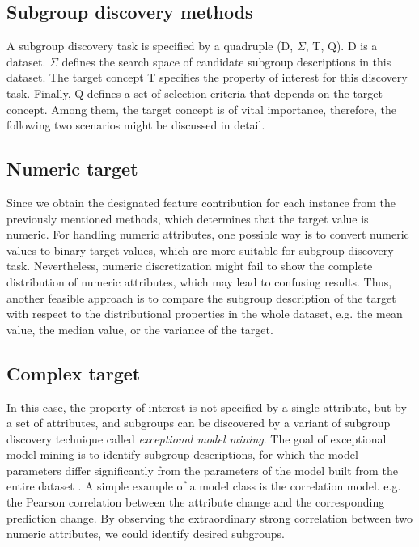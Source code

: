 \documentclass[runningheads]{llncs}
\begin{document}
	\subsection{Subgroup discovery methods}
	
	A subgroup discovery task is specified by a quadruple (D, $\Sigma$, T, Q). D is a dataset. $\Sigma$ defines the search space of candidate subgroup descriptions in this dataset. The target concept T specifies the property of interest for this discovery task. Finally, Q defines a set of selection criteria that depends on the target concept. Among them, the target concept is of vital importance, therefore, the following two scenarios might be discussed in detail.
	
	\subsection{Numeric target }
	
	Since we obtain the designated feature contribution for each instance from the previously mentioned methods, which determines that the target value is numeric. For handling numeric attributes, one possible way is to convert numeric values to binary target values, which are more suitable for subgroup discovery task. Nevertheless, numeric discretization might fail to show the complete distribution of numeric attributes, which may lead to confusing results. Thus, another feasible approach is to compare the subgroup description of the target with respect to the distributional properties in the whole dataset, e.g. the mean value, the median value, or the variance of the target.
	
	\subsection{Complex target }
	
	In this case, the property of interest is not specified by a single attribute, but by a set of attributes, and subgroups can be discovered by a variant of subgroup discovery technique called \textit{exceptional model mining}. The goal of exceptional model mining is to identify subgroup descriptions, for which the model parameters differ significantly from the parameters of the model built from the entire dataset \cite{leman2008exceptional}. A simple example of a model class is the correlation model. e.g. the Pearson correlation between the attribute change and the corresponding prediction change. By observing the extraordinary strong correlation between two numeric attributes, we could identify desired subgroups. 
	
\end{document}

